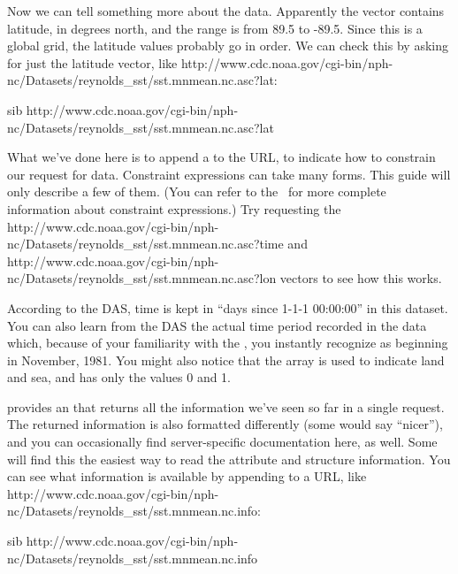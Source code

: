 \documentclass{dods-book}
\begin{document}
Now we can tell something more about the data.  Apparently the
 vector contains latitude, in degrees north, and the range is
from 89.5 to -89.5.  Since this is a global grid, the latitude values
probably go in order.  We can check this by asking for just the
latitude vector, like %
{http://www.cdc.noaa.gov/cgi-bin/nph-nc/Datasets/reynolds_sst/sst.mnmean.nc.asc?lat}:

\begin{vcode}[.]{sib}
http://www.cdc.noaa.gov/cgi-bin/nph-nc/Datasets/reynolds_sst/sst.mnmean.nc.asc?lat
\end{vcode}

What we've done here is to append a 
 to the \opendap URL, to indicate how to
constrain our request for data.  Constraint expressions can take many
forms.  This guide will only describe a few of them.  (You can refer
to the \OPDuser\ for more complete information about constraint
expressions.)  Try requesting the
%
{http://www.cdc.noaa.gov/cgi-bin/nph-nc/Datasets/reynolds_sst/sst.mnmean.nc.asc?time}
and 
{http://www.cdc.noaa.gov/cgi-bin/nph-nc/Datasets/reynolds_sst/sst.mnmean.nc.asc?lon}
vectors to see how this works.

According to the DAS, time is kept in ``days since 1-1-1 00:00:00'' in
this dataset.  You can also learn from the DAS the actual time period
recorded in the data which, because of your familiarity with the
, you instantly recognize as beginning in November,
1981.  You might also notice that the  array is used to
indicate land and sea, and has only the values 0 and
1. 

\opendap provides an  that returns all the information
we've seen so far in a single 
request.  The returned information is also formatted differently (some
would say ``nicer''), and you can occasionally find server-specific
documentation here, as well.  Some will find this the easiest way to
read the attribute and structure information.  You can see what
information is available by appending  to a URL, like
{http://www.cdc.noaa.gov/cgi-bin/nph-nc/Datasets/reynolds_sst/sst.mnmean.nc.info}:

\begin{vcode}[.]{sib}
http://www.cdc.noaa.gov/cgi-bin/nph-nc/Datasets/reynolds_sst/sst.mnmean.nc.info
\end{vcode}
\end{document}
